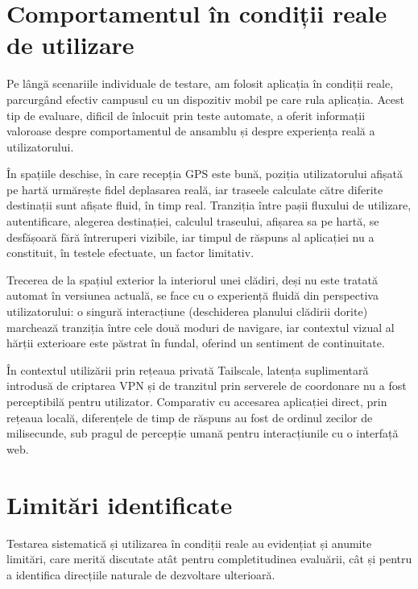 \section{Comportamentul în condiții reale de utilizare}
\label{sec:conditii-reale}
 
Pe lângă scenariile individuale de testare, am folosit aplicația în
condiții reale, parcurgând efectiv campusul cu un dispozitiv mobil pe care rula
aplicația. Acest tip de evaluare, dificil de înlocuit prin teste automate, a
oferit informații valoroase despre comportamentul de ansamblu și despre
experiența reală a utilizatorului.
 
În spațiile deschise, în care recepția GPS este bună, poziția utilizatorului
afișată pe hartă urmărește fidel deplasarea reală, iar traseele calculate către
diferite destinații sunt afișate fluid, în timp real. Tranziția între pașii
fluxului de utilizare, autentificare, alegerea destinației, calculul traseului,
afișarea sa pe hartă, se desfășoară fără întreruperi vizibile, iar timpul de
răspuns al aplicației nu a constituit, în testele efectuate, un factor limitativ.
 
Trecerea de la spațiul exterior la interiorul unei clădiri, deși nu este
tratată automat în versiunea actuală, se face cu o experiență fluidă din
perspectiva utilizatorului: o singură interacțiune (deschiderea planului
clădirii dorite) marchează tranziția între cele două moduri de navigare, iar
contextul vizual al hărții exterioare este păstrat în fundal, oferind un
sentiment de continuitate.
 
În contextul utilizării prin rețeaua privată Tailscale, latența suplimentară
introdusă de criptarea VPN și de tranzitul prin serverele de coordonare nu a
fost perceptibilă pentru utilizator. Comparativ cu accesarea aplicației
direct, prin rețeaua locală, diferențele de timp de răspuns au fost de ordinul
zecilor de milisecunde, sub pragul de percepție umană pentru interacțiunile
cu o interfață web.


\section{Limitări identificate}
\label{sec:limitari}

Testarea sistematică și utilizarea în condiții reale au evidențiat și anumite
limitări, care merită discutate atât pentru completitudinea evaluării, cât și
pentru a identifica direcțiile naturale de dezvoltare ulterioară.

